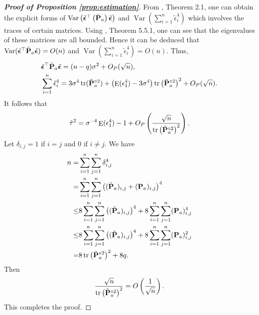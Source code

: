 \documentclass[11pt]{article}
\DeclareMathOperator{\mytr}{tr}
\DeclareMathOperator{\myE}{E}
\DeclareMathOperator{\myVar}{Var}
\theoremstyle{plain}
\theoremstyle{definition}
\theoremstyle{remark}
\begin{document}
\begin{proof}[\textbf{Proof of Proposition \ref{prop:estimation}}]
    From \cite{Bai2017}, Theorem 2.1, one can obtain the explicit forms of $\myVar \left( \tilde \bepsilon^\top \left( \tilde \BP_a \right) \tilde \bepsilon  \right)$ and $\myVar \left( \sum_{i=1}^n \tilde \epsilon_i^4 \right)$ which involves the traces of certain matrices.
    Using \cite{book:1244195}, Theorem 5.5.1, one can see that the eigenvalues of these matrices are all bounded.
    Hence it can be deduced that $\myVar ( \tilde \bepsilon^\top  \tilde \BP_a \tilde \bepsilon  )=O(n)$ and $\myVar \left( \sum_{i=1}^n \tilde \epsilon_i^4 \right)=O(n)$.
    Thus,
    \begin{align*}
        & \tilde \bepsilon^\top  \tilde \BP_a  \tilde \bepsilon
        = (n-q) \sigma^2+O_P(\sqrt n),
        \\
        & \sum_{i=1}^n \tilde \epsilon_i^4 
        =
        3\sigma^4 \mytr (\tilde \BP_a^{\circ 2}) 
        +\left( \myE (\epsilon_1^4)-3 \sigma^{4}\right)
        \mytr \left( \tilde \BP_a^{\circ 2}  \right)^2 + O_P(\sqrt n).
    \end{align*}
    It follows that
    \begin{equation*}
        \hat \tau ^2 = \sigma^{-4}\myE (\epsilon_1^4)-1
        +O_P\left( \frac{\sqrt n}{\mytr \left( \tilde \BP_a ^{\circ 2} \right)^2} \right).
    \end{equation*}
    Let $\delta_{i,j}=1$ if $i=j$ and $0$ if $i\neq j$.
    We have
    \begin{equation*}
        \begin{split}
        n=&
        \sum_{i=1}^n \sum_{j=1}^n \delta_{i,j}^4 
        \\
        =&
        \sum_{i=1}^n \sum_{j=1}^n \left( (\tilde \BP_{a})_{i,j}+(\BP_{a})_{i,j} \right)^4 
        \\
        \leq&
    8\sum_{i=1}^n \sum_{j=1}^n \left( (\tilde \BP_{a})_{i,j}\right)^4+
    8\sum_{i=1}^n \sum_{j=1}^n(\BP_{a})_{i,j}^4
        \\
        \leq&
    8\sum_{i=1}^n \sum_{j=1}^n \left( (\tilde \BP_{a})_{i,j}\right)^4+
    8\sum_{i=1}^n \sum_{j=1}^n(\BP_{a})_{i,j}^2
    \\
    =&
        8\mytr \left(   \tilde \BP_a^{\circ 2} \right)^2
        +8q.
        \end{split}
    \end{equation*}
    Then
    \begin{equation*}
        \frac{\sqrt n}{\mytr \left( \tilde \BP_a^{\circ 2} \right)^2} 
        =
        O\left( \frac{1}{\sqrt n} \right).
    \end{equation*}
    This completes the proof.
\end{proof}
\end{document}
